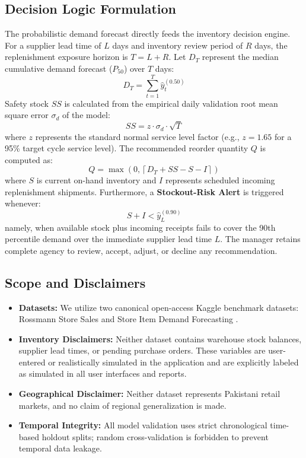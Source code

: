 \documentclass[11pt,a4paper]{article}
\begin{document}
\subsection{Decision Logic Formulation}
The probabilistic demand forecast directly feeds the inventory decision engine. For a supplier lead time of $L$ days and inventory review period of $R$ days, the replenishment exposure horizon is $T = L + R$. Let $D_T$ represent the median cumulative demand forecast ($P_{50}$) over $T$ days:
\begin{equation}
D_T = \sum_{t=1}^{T} \hat{y}_{t}^{(0.50)}
\end{equation}
Safety stock $SS$ is calculated from the empirical daily validation root mean square error $\sigma_d$ of the model:
\begin{equation}
SS = z \cdot \sigma_d \cdot \sqrt{T}
\end{equation}
where $z$ represents the standard normal service level factor (e.g., $z = 1.65$ for a 95\% target cycle service level). The recommended reorder quantity $Q$ is computed as:
\begin{equation}
Q = \max\left(0, \left\lceil D_T + SS - S - I \right\rceil\right)
\end{equation}
where $S$ is current on-hand inventory and $I$ represents scheduled incoming replenishment shipments. Furthermore, a \textbf{Stockout-Risk Alert} is triggered whenever:
\begin{equation}
S + I < \hat{y}_{L}^{(0.90)}
\end{equation}
namely, when available stock plus incoming receipts fails to cover the 90th percentile demand over the immediate supplier lead time $L$. The manager retains complete agency to review, accept, adjust, or decline any recommendation.

\subsection{Scope and Disclaimers}
\begin{itemize}
    \item \textbf{Datasets:} We utilize two canonical open-access Kaggle benchmark datasets: Rossmann Store Sales \cite{rossmann_kaggle} and Store Item Demand Forecasting \cite{store_item_kaggle}.
    \item \textbf{Inventory Disclaimers:} Neither dataset contains warehouse stock balances, supplier lead times, or pending purchase orders. These variables are user-entered or realistically simulated in the application and are explicitly labeled as simulated in all user interfaces and reports.
    \item \textbf{Geographical Disclaimer:} Neither dataset represents Pakistani retail markets, and no claim of regional generalization is made.
    \item \textbf{Temporal Integrity:} All model validation uses strict chronological time-based holdout splits; random cross-validation is forbidden to prevent temporal data leakage.
\end{itemize}
\end{document}
